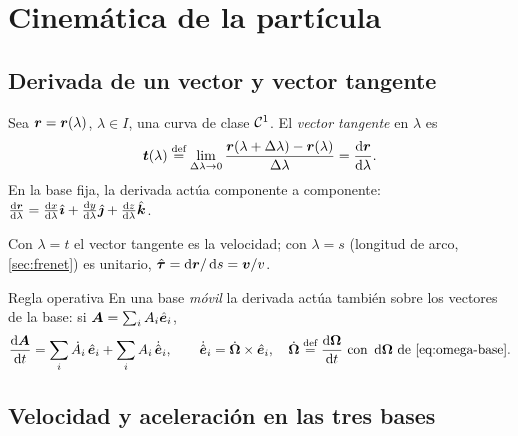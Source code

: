 \section{Cinemática de la partícula}
\label{sec:cinematica}

\subsection{Derivada de un vector y vector tangente}

\begin{definicion}
Sea $\bm{r}=\bm{r}(\lambda)$, $\lambda\in I$, una curva de clase $\mathcal{C}^{1}$. El
\emph{vector tangente} en $\lambda$ es
\begin{equation}
  \bm{t}(\lambda)\stackrel{\text{def}}{=}\lim_{\Delta\lambda\to0}\frac{\bm{r}(\lambda+\Delta\lambda)-\bm{r}(\lambda)}{\Delta\lambda}
  =\frac{\mathop{}\!\mathrm{d} \bm{r}}{\mathop{}\!\mathrm{d} \lambda}.
\end{equation}
En la base fija, la derivada actúa componente a componente:
$\od{\vb{r}}{\lambda}=\od{x}{\lambda}\ii+\od{y}{\lambda}\jj+\od{z}{\lambda}\kk$.
\end{definicion}

Con $\lambda=t$ el vector tangente es la velocidad; con $\lambda=s$ (longitud
de arco, \cref{sec:frenet}) es unitario, $\hat{\bm{\tau}}=\mathop{}\!\mathrm{d}\bm{r}/\mathop{}\!\mathrm{d} s=\bm{v}/v$.

\begin{clave}{Regla operativa}
En una base \emph{móvil} la derivada actúa también sobre los vectores de la
base: si $\bm{A}=\sum_{i}A_{i}\hat{\bm{e}}_{i}$,
\begin{equation}
  \frac{\mathop{}\!\mathrm{d} \bm{A}}{\mathop{}\!\mathrm{d} t}=\sum_{i}\dot A_{i}\,\hat{\bm{e}}_{i}+\sum_{i}A_{i}\,\dot{\hat{\bm{e}}}_{i},
  \qquad \dot{\hat{\bm{e}}}_{i}=\dot{\bm{\Omega}}\times\hat{\bm{e}}_{i},\quad
  \dot{\bm{\Omega}}\stackrel{\text{def}}{=}\frac{\mathop{}\!\mathrm{d} \bm{\Omega}}{\mathop{}\!\mathrm{d} t}\ \text{con }\mathop{}\!\mathrm{d}\bm{\Omega}\text{ de \eqref{eq:omega-base}}.
  \label{eq:derivada-movil}
\end{equation}
\end{clave}

\subsection{Velocidad y aceleración en las tres bases}

